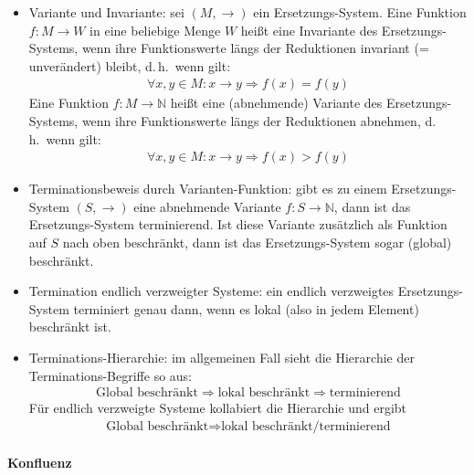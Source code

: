 \documentclass[
  a4paper,
  11pt,
]{scrartcl}
\newcommand{\N}{\mathbb{N}}
\begin{document}
\begin{itemize}
  \item Variante und Invariante: sei $(M, \rightarrow)$ ein Ersetzungs-System.
    Eine Funktion $f : M \rightarrow W$ in eine beliebige Menge $W$ heißt eine
    Invariante des Ersetzungs-Systems, wenn ihre Funktionswerte längs der
    Reduktionen invariant (= unverändert) bleibt, d.\,h.\ wenn gilt:
    \begin{align*}
      \forall x, y \in M: x \rightarrow y \Rightarrow f(x) = f(y)
    \end{align*}
    Eine Funktion $f : M \rightarrow \N$ heißt eine (abnehmende) Variante des
    Ersetzungs-Systems, wenn ihre Funktionswerte längs der Reduktionen abnehmen,
    d.\,h.\ wenn gilt:
    \begin{align*}
      \forall x, y \in M: x \rightarrow y \Rightarrow f(x) > f(y)
    \end{align*}

  \item Terminationsbeweis durch Varianten-Funktion: gibt es zu einem
    Ersetzungs-System $(S, \rightarrow)$ eine abnehmende Variante $f : S
    \rightarrow \N$, dann ist das Ersetzungs-System terminierend. Ist diese
    Variante zusätzlich als Funktion auf $S$ nach oben beschränkt, dann ist das
    Ersetzungs-System sogar (global) beschränkt.

  \item Termination endlich verzweigter Systeme: ein endlich verzweigtes
    Ersetzungs-System terminiert genau dann, wenn es lokal (also in jedem
    Element) beschränkt ist.

  \item Terminations-Hierarchie: im allgemeinen Fall sieht die Hierarchie der
    Terminations-Begriffe so aus:
    \begin{align*}
      \text{Global beschränkt} \Rightarrow \text{lokal beschränkt} \Rightarrow
      \text{terminierend}
    \end{align*}
    Für endlich verzweigte Systeme kollabiert die Hierarchie und ergibt
    \begin{align*}
      \text{Global beschränkt} \Rightarrow \text{lokal beschränkt/terminierend}
    \end{align*}
\end{itemize}

\paragraph{Konfluenz}
\label{par:konfluenz}
\end{document}
